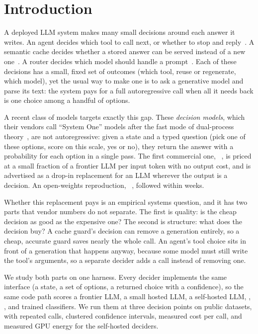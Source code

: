 \section{Introduction}
\label{sec:intro}

A deployed LLM system makes many small decisions around each answer it writes.
An agent decides which tool to call next, or whether to stop and reply~\cite{yao2024taubench}.
A semantic cache decides whether a stored answer can be served instead of a new one~\cite{bang2023gptcache,schroeder2025vcache}.
A router decides which model should handle a prompt~\cite{chen2023frugalgpt,ong2024routellm}.
Each of these decisions has a small, fixed set of outcomes (which tool, reuse or regenerate, which model), yet the usual way to make one is to ask a generative model and parse its text: the system pays for a full autoregressive call when all it needs back is one choice among a handful of options.

A recent class of models targets exactly this gap.
These \emph{decision models}, which their vendors call ``System One'' models after the fast mode of dual-process theory~\cite{kahneman2011thinking}, are not autoregressive: given a state and a typed question (pick one of these options, score on this scale, yes or no), they return the answer with a probability for each option in a single pass.
The first commercial one, \jev~\cite{typesafe2026jev}, is priced at a small fraction of a frontier LLM per input token with no output cost, and is advertised as a drop-in replacement for an LLM wherever the output is a decision.
An open-weights reproduction, \kev~\cite{palmer2026kev}, followed within weeks.

Whether this replacement pays is an empirical systems question, and it has two parts that vendor numbers do not separate.
The first is quality: is the cheap decision as good as the expensive one?
The second is structure: what does the decision buy?
A cache guard's decision can remove a generation entirely, so a cheap, accurate guard saves nearly the whole call.
An agent's tool choice sits in front of a generation that happens anyway, because some model must still write the tool's arguments, so a separate decider adds a call instead of removing one.

We study both parts on one harness.
Every decider implements the same interface (a state, a set of options, a returned choice with a confidence), so the same code path scores a frontier LLM, a small hosted LLM, a self-hosted LLM, \jev, \kev, and trained classifiers.
We run them at three decision points on public datasets, with repeated calls, clustered confidence intervals, measured cost per call, and measured GPU energy for the self-hosted deciders.

